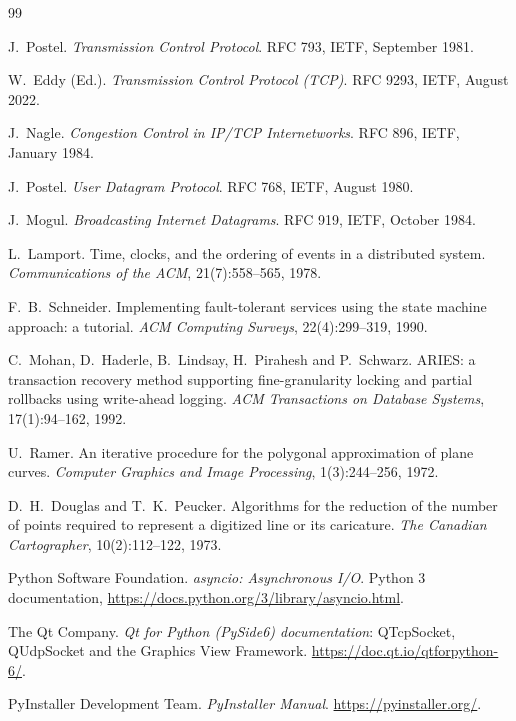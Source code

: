 \documentclass[11pt,a4paper]{article}
\begin{document}
\begin{thebibliography}{99}
\setlength{\itemsep}{1pt}
\small

 J.~Postel. \emph{Transmission Control Protocol}. RFC 793, IETF, September 1981.

 W.~Eddy (Ed.). \emph{Transmission Control Protocol (TCP)}. RFC 9293, IETF,
August 2022.

 J.~Nagle. \emph{Congestion Control in IP/TCP Internetworks}. RFC 896, IETF,
January 1984.

 J.~Postel. \emph{User Datagram Protocol}. RFC 768, IETF, August 1980.

 J.~Mogul. \emph{Broadcasting Internet Datagrams}. RFC 919, IETF, October 1984.

 L.~Lamport. Time, clocks, and the ordering of events in a distributed system.
\emph{Communications of the ACM}, 21(7):558--565, 1978.

 F.~B.~Schneider. Implementing fault-tolerant services using the state machine
approach: a tutorial. \emph{ACM Computing Surveys}, 22(4):299--319, 1990.

 C.~Mohan, D.~Haderle, B.~Lindsay, H.~Pirahesh and P.~Schwarz. ARIES: a
transaction recovery method supporting fine-granularity locking and partial rollbacks using
write-ahead logging. \emph{ACM Transactions on Database Systems}, 17(1):94--162, 1992.

 U.~Ramer. An iterative procedure for the polygonal approximation of plane curves.
\emph{Computer Graphics and Image Processing}, 1(3):244--256, 1972.

 D.~H.~Douglas and T.~K.~Peucker. Algorithms for the reduction of the number of
points required to represent a digitized line or its caricature. \emph{The Canadian
Cartographer}, 10(2):112--122, 1973.

 Python Software Foundation. \emph{asyncio: Asynchronous I/O}. Python 3
documentation, \url{https://docs.python.org/3/library/asyncio.html}.

 The Qt Company. \emph{Qt for Python (PySide6) documentation}: QTcpSocket,
QUdpSocket and the Graphics View Framework. \url{https://doc.qt.io/qtforpython-6/}.

 PyInstaller Development Team. \emph{PyInstaller Manual}.
\url{https://pyinstaller.org/}.

\end{thebibliography}
\end{document}

